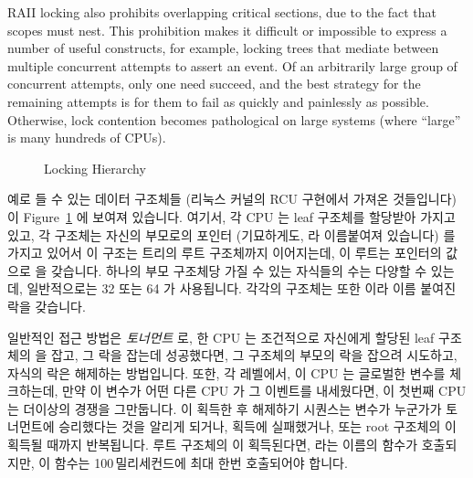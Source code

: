 RAII locking also prohibits overlapping critical sections, due to the fact
that scopes must nest.
This prohibition makes it difficult or impossible to express a number of
useful constructs, for example, locking trees
that mediate between multiple concurrent attempts to assert an event.
Of an arbitrarily large group of concurrent attempts, only one need succeed,
and the best strategy for the remaining attempts is for them to fail as
quickly and painlessly as possible.
Otherwise, lock contention becomes pathological on large systems
(where ``large'' is many hundreds of CPUs).
\fi

\begin{figure}[tb]
\centering
{}
\caption{Locking Hierarchy}
\label{fig:lock:Locking Hierarchy}
\end{figure}

예로 들 수 있는 데이터 구조체들 (리눅스 커널의 RCU 구현에서 가져온 것들입니다)
이 Figure~\ref{fig:lock:Locking Hierarchy} 에 보여져 있습니다.
여기서, 각 CPU 는 leaf  구조체를 할당받아 가지고 있고, 각
 구조체는 자신의 부모로의 포인터 (기묘하게도,  라
이름붙여져 있습니다) 를 가지고 있어서 이 구조는 트리의 루트 
구조체까지 이어지는데, 이 루트는  포인터의 값으로  을
갖습니다.
하나의 부모  구조체당 가질 수 있는 자식들의 수는 다양할 수 있는데,
일반적으로는 32 또는 64 가 사용됩니다.
각각의  구조체는 또한  이라 이름 붙여진 락을
갖습니다.

일반적인 접근 방법은 \emph{토너먼트} 로, 한 CPU 는 조건적으로 자신에게 할당된
leaf  구조체의  을 잡고, 그 락을 잡는데 성공했다면,
그 구조체의 부모의 락을 잡으려 시도하고, 자식의 락은 해제하는 방법입니다.
또한, 각 레벨에서, 이 CPU 는 글로벌한  변수를 체크하는데, 만약 이
변수가 어떤 다른 CPU 가 그 이벤트를 내세웠다면, 이 첫번째 CPU 는 더이상의
경쟁을 그만둡니다.
이 획득한 후 해제하기 시퀀스는  변수가 누군가가 토너먼트에
승리했다는 것을 알리게 되거나,  획득에 실패했거나, 또는 root
 구조체의  이 획득될 때까지 반복됩니다.
루트  구조체의  이 획득된다면,
 라는 이름의 함수가 호출되지만, 이 함수는
100\,밀리세컨드에 최대 한번 호출되어야 합니다.
\iffalse

